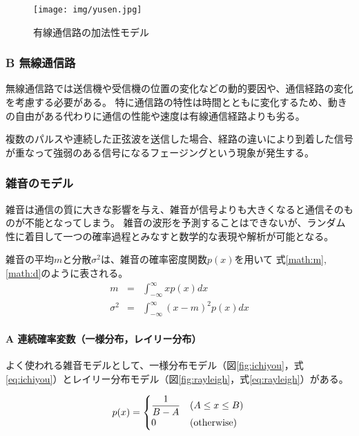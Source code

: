\documentclass[twocolumn, dvipdfmx, 9pt]{jsarticle}
\begin{document}
\begin{figure}[h]
\centering
  \texttt{[image: img/yusen.jpg]}
  \caption{有線通信路の加法性モデル}
  \label{fig:yusen}
\end{figure}

\subsubsection*{B 無線通信路}

無線通信路では送信機や受信機の位置の変化などの動的要因や、通信経路の変化を考慮する必要がある。
特に通信路の特性は時間とともに変化するため、動きの自由がある代わりに通信の性能や速度は有線通信経路よりも劣る。

複数のパルスや連続した正弦波を送信した場合、経路の違いにより到着した信号が重なって強弱のある信号になるフェージングという現象が発生する。


\subsubsection{雑音のモデル}

雑音は通信の質に大きな影響を与え、雑音が信号よりも大きくなると通信そのものが不能となってしまう。
雑音の波形を予測することはできないが、ランダム性に着目して一つの確率過程とみなすと数学的な表現や解析が可能となる。


雑音の平均$ m $と分散$ \sigma^{2} $は、雑音の確率密度関数$ p(x) $を用いて
式\eqref{math:m},\eqref{math:d}のように表される。
\begin{eqnarray}\label{math:m}
  m &=& \int^{\infty}_{-\infty} x p \left( x \right) dx \\
  \label{math:d} \sigma^{2} &=&  \int^{\infty}_{-\infty} \left( x - m \right) ^{2} p \left( x \right) dx
\end{eqnarray}




\paragraph*{A 連続確率変数（一様分布，レイリー分布）}\par

よく使われる雑音モデルとして、一様分布モデル（図\ref{fig:ichiyou}，式\eqref{eq:ichiyou}）とレイリー分布モデル（図\ref{fig:rayleigh}，式\eqref{eq:rayleigh}）がある。

  \begin{equation}\label{eq:ichiyou}
    p(x) = 
    \begin{cases}
      \dfrac{1}{B - A} & (A \le x \le B) \\
    0 & (\text{otherwise})
    \end{cases} \\
  \end{equation}
\end{document}
